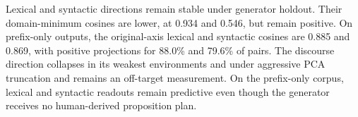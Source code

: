 Lexical and syntactic directions remain stable under generator holdout. Their domain-minimum cosines are lower, at 0.934 and 0.546, but remain positive. On prefix-only outputs, the original-axis lexical and syntactic cosines are 0.885 and 0.869, with positive projections for 88.0\% and 79.6\% of pairs. The discourse direction collapses in its weakest environments and under aggressive PCA truncation and remains an off-target measurement. On the prefix-only corpus, lexical and syntactic readouts remain predictive even though the generator receives no human-derived proposition plan.

